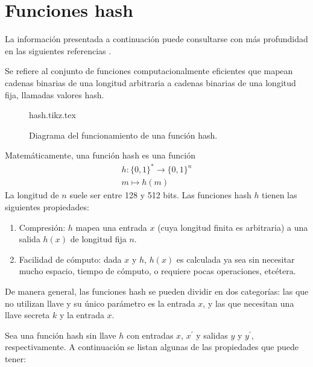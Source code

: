 %
%

\section{Funciones hash}
\label{sec:hash}

La información presentada a continuación puede consultarse con más profundidad
en las siguientes referencias
\cite{hash_hussein, menezes, DBLP:series/isc/DelfsK07, hash_gupta}.

Se refiere al conjunto de funciones computacionalmente eficientes que
mapean cadenas binarias de una longitud arbitraria a cadenas binarias
de una longitud fija, llamadas valores hash.

\begin{figure}
  \begin{center}
    {hash.tikz.tex}
    \caption{Diagrama del funcionamiento de una función hash.}
   \end{center}
\end{figure}

Matemáticamente, una función hash es una función
\begin{equation}
  \label{funcion_hash_def}
  \begin{split}
    h: \{0, 1\}^* \longrightarrow \{0,1\}^n \\
    m \longmapsto h(m)
  \end{split}
\end{equation}
La longitud de $n$ suele ser entre 128 y 512 bits. Las funciones hash
$h$ tienen las siguientes propiedades:

\begin{enumerate}
  \item Compresión: $h$ mapea una entrada $x$ (cuya longitud
    finita es arbitraria) a una salida $h(x)$ de longitud fija $n$.
  \item Facilidad de cómputo: dada $x$ y $h$, $h(x)$ es
    calculada ya sea sin necesitar mucho espacio, tiempo de cómputo, o
    requiere pocas operaciones, etcétera.
\end{enumerate}

De manera general, las funciones hash se pueden dividir en dos
categorías: las que no utilizan llave y su único parámetro es la entrada
$x$, y las que necesitan una llave secreta $k$ y la entrada $x$.

Sea una función hash sin llave $h$ con entradas $x$, $x^\prime$ y
salidas $y$ y $y^\prime$, respectivamente. A continuación se listan
algunas de las propiedades que puede tener:

